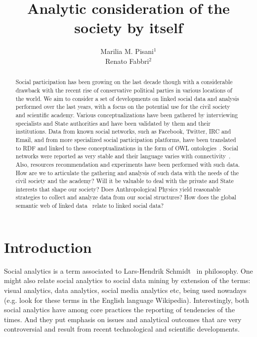 \documentclass[letterpaper,10pt]{article}
\begin{document}
\title{Analytic consideration of the society by itself}

\author{Marilia M. Pisani$^1$\\
Renato Fabbri$^2$}
\address{$^1$CCNH/UFABC, $^2$IFSC/USP}

\begin{abstract}
Social participation has been growing on the last decade though with a considerable
drawback with the recent rise of conservative political parties 
in various locations of the world.
We aim to consider a set of developments on linked social data
and analysis performed over the last years, with a focus
on the potential use for the civil society and scientific academy.
Various conceptualizations have been gathered by interviewing specialists
and State authorities and have been validated by them and their institutions.
Data from known social networks, such as Facebook, Twitter, IRC and Email,
and from more specialized social participation platforms, have been
	translated to RDF and linked to these conceptualizations in the form of OWL ontologies~\cite{losd,pnud5}.
Social networks were reported as very stable and their language varies
	with connectivity~\cite{tese,stab}.
	Also, resources recommendation and experiments have been performed with such data.
	How are we to articulate the gathering and analysis 
	of such data with the needs of the civil society and the academy?
	Will it be valuable to deal with the private and State interests
	that shape our society?
	Does Anthropological Physics yield reasonable strategies
	to collect and analyze data from our social structures?
	How does the global semantic web of linked data~\cite{losd}
	relate to linked social data?
\end{abstract}

\section{Introduction}
Social analytics is a term associated to Lars-Hendrik Schmidt~\cite{wSA}
in philosophy.
One might also relate social analytics to social data mining
by extension of the terms: visual analytics, data analytics, social media analytics etc,
being used nowadays (e.g. look for these terms in the English language Wikipedia).
Interestingly, both social analytics 
have among core practices the reporting of tendencies of the times.
And they put emphasis on issues and analytical outcomes
that are very controversial and result from recent technological and scientific developments.
\end{document}
